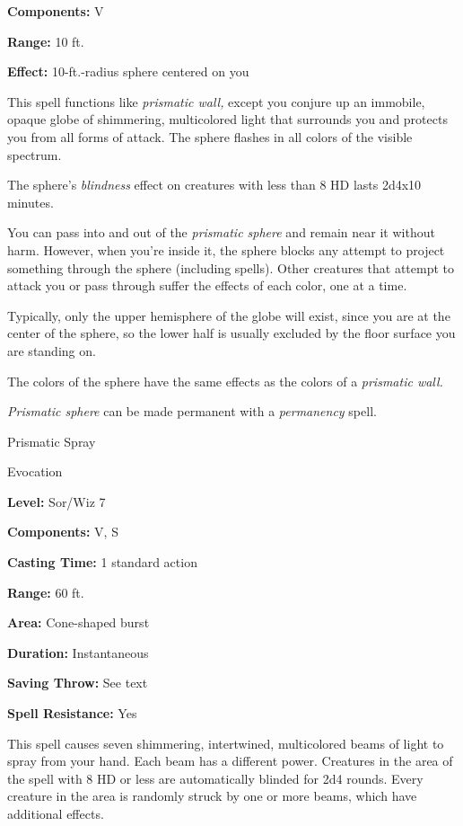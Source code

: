 \documentclass{article}
\begin{document}
\textbf{Components:} V

\textbf{Range:} 10 ft.

\textbf{Effect:} 10-ft.-radius sphere centered on you

This spell functions like \textit{prismatic wall, }except you conjure up an immobile, 
opaque globe of shimmering, multicolored light that surrounds you and protects 
you from all forms of attack. The sphere flashes in all colors of the visible spectrum. 

The sphere's \textit{blindness }effect on creatures with less than 8 HD lasts 2d4x10 
minutes.

You can pass into and out of the \textit{prismatic sphere }and remain near it without 
harm. However, when you're inside it, the sphere blocks any attempt to project 
something through the sphere (including spells). Other creatures that attempt to 
attack you or pass through suffer the effects of each color, one at a time.

Typically, only the upper hemisphere of the globe will exist, since you are at 
the center of the sphere, so the lower half is usually excluded by the floor surface 
you are standing on.

The colors of the sphere have the same effects as the colors of a \textit{prismatic 
wall.}

\textit{Prismatic sphere }can be made permanent with a \textit{permanency }spell.

\vspace{12pt}
Prismatic Spray

Evocation

\textbf{Level:} Sor/Wiz 7

\textbf{Components:} V, S

\textbf{Casting Time:} 1 standard action

\textbf{Range:} 60 ft.

\textbf{Area:} Cone-shaped burst

\textbf{Duration:} Instantaneous

\textbf{Saving Throw:} See text

\textbf{Spell Resistance:} Yes

This spell causes seven shimmering, intertwined, multicolored beams of light to 
spray from your hand. Each beam has a different power. Creatures in the area of 
the spell with 8 HD or less are automatically blinded for 2d4 rounds. Every creature 
in the area is randomly struck by one or more beams, which have additional effects.
\end{document}
